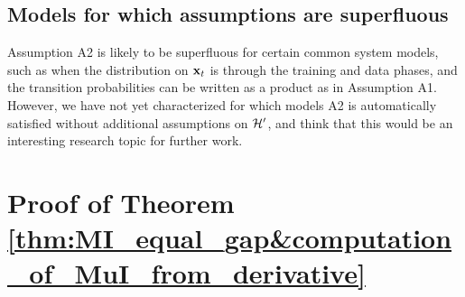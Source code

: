 \documentclass[12pt, draftclsnofoot,journal,onecolumn]{IEEEtran}
\begin{document}
\subsection{Models for which assumptions are superfluous}

Assumption A2 is likely to be superfluous for certain common system models, such as when the distribution on ${\mathbf{x}}_t$ is \iid through the training and data phases, and the transition probabilities can be written as a product as in Assumption A1. However, we have not yet characterized for which models A2 is automatically satisfied without additional assumptions on ${\cal H}'$, and think that this would be an interesting research topic for further work.



\appendices


\section{Proof of Theorem \ref{thm:MI_equal_gap&computation_of_MuI_from_derivative}}
\label{app:proof_MI_equal_gap&computation_of_MuI_from_derivative}
\end{document}

